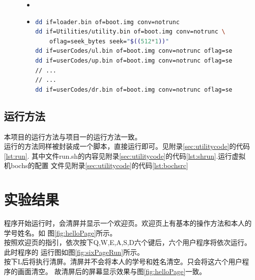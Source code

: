 \documentclass[a4paper]{article}
\begin{document}
    \begin{figure}
    \begin{itemize}
        \item[]
    \end{itemize}
    \end{figure}


    \begin{figure}
    \begin{itemize}
    \item[] \begin{lstlisting}[language=sh, label=lst:build, caption=向虚拟软盘内写入比特的部分代码]
dd if=loader.bin of=boot.img conv=notrunc
dd if=Utilities/utility.bin of=boot.img conv=notrunc \
    oflag=seek_bytes seek="$((512*1))"
dd if=userCodes/ul.bin of=boot.img conv=notrunc oflag=seek_bytes seek="$((512*2))"
dd if=userCodes/up.bin of=boot.img conv=notrunc oflag=seek_bytes seek="$((512*3))"
// ...
// ...
dd if=userCodes/dr.bin of=boot.img conv=notrunc oflag=seek_bytes seek="$((512*7))"
    \end{lstlisting}
    \end{itemize}
    \end{figure}
    \subsection{运行方法}
    本项目的运行方法与项目一的运行方法一致。\\
    
    运行的方法同样被封装成一个脚本，直接运行即可。见附录\ref{sec:utilitycode}的代码\ref{lst:run}.
    其中文件run.sh的内容见附录\ref{sec:utilitycode}的代码\ref{lst:shrun}.运行虚拟机bochs的配置
    文件见附录\ref{sec:utilitycode}的代码\ref{lst:bochsrc}
\section{实验结果}
    程序开始运行时，会清屏并显示一个欢迎页。欢迎页上有基本的操作方法和本人的学号姓名。如
    图\ref{fig:helloPage}所示。\\
    
    按照欢迎页的指引，依次按下Q,W,E,A,S,D六个键后，六个用户程序将依次运行。此时程序的
    运行图如图\ref{fig:sixPageRun}所示。\\
    
    按下L后将执行清屏。清屏并不会将本人的学号和姓名清空。只会将这六个用户程序的画面清空。
    故清屏后的屏幕显示效果与图\ref{fig:helloPage}一致。
\end{document}
